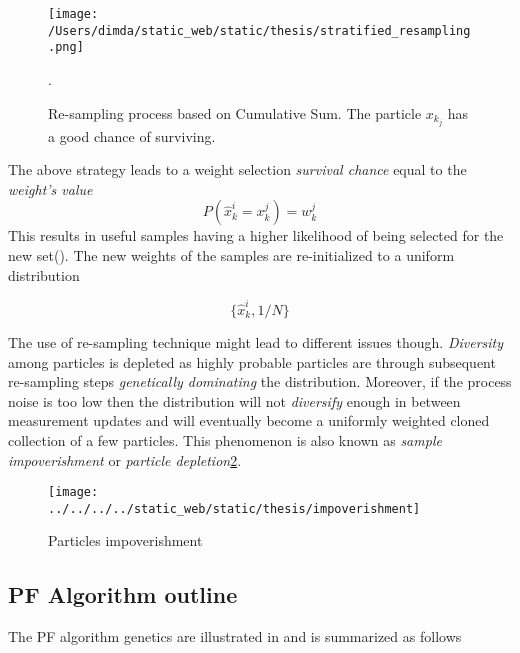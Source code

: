 \begin{figure}[H]
	\centering
	\texttt{[image: /Users/dimda/static\_web/static/thesis/stratified\_resampling.png]}
	\caption{Re-sampling process based on Cumulative Sum. The particle $x_{k_j}$ has a good chance of surviving.}.
	\label{fig:CSW}
\end{figure}


The above strategy leads to a weight selection \emph{survival chance} equal to the \emph{weight's value}
$$P(\hat{x}_k^i = x_k^j) = w_k^j$$ This results in useful samples having a higher likelihood of being selected for the new set(). The new weights of the samples are re-initialized to a uniform distribution

\begin{equation}\label{eq:normalize2CSW}
	\{\hat{x}_k^i , 1/N\}
\end{equation}



The use of re-sampling technique might lead to different issues though. \emph{Diversity} among particles is depleted as highly probable particles are through subsequent re-sampling steps \emph{genetically dominating} the distribution. Moreover, if the process noise is too low then the distribution will not \emph{diversify} enough in between measurement updates and will eventually become a uniformly weighted cloned collection of a few particles. This phenomenon is also known as \emph{sample impoverishment} or \emph{particle depletion}\ref{fig:impoverishment}\cite{Chatzi2002}.

\begin{figure}[H]
	\centering
	\texttt{[image: ../../../../static\_web/static/thesis/impoverishment]}
	\caption{Particles impoverishment\cite{Ju2019}}
	\label{fig:impoverishment}
\end{figure}


\subsection{PF Algorithm outline}


The PF algorithm genetics are illustrated in  and is summarized as follows

